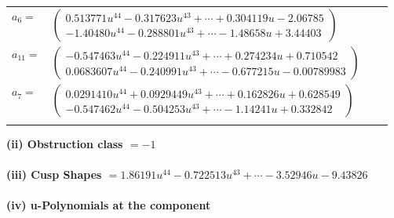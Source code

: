 \documentclass[1p]{elsarticle_modified}
\theoremstyle{definition}
\begin{document}
\begin{tabular}{m{7pt} m{180pt} m{7pt} m{180pt} }
\flushright $a_{6}=$&$\begin{pmatrix}0.513771 u^{44}-0.317623 u^{43}+\cdots+0.304119 u-2.06785\\-1.40480 u^{44}-0.288801 u^{43}+\cdots-1.48658 u+3.44403\end{pmatrix}$ \\
\flushright $a_{11}=$&$\begin{pmatrix}-0.547463 u^{44}-0.224911 u^{43}+\cdots+0.274234 u+0.710542\\0.0683607 u^{44}-0.240991 u^{43}+\cdots-0.677215 u-0.00789983\end{pmatrix}$ \\
\flushright $a_{7}=$&$\begin{pmatrix}0.0291410 u^{44}+0.0929449 u^{43}+\cdots+0.162826 u+0.628549\\-0.547462 u^{44}-0.504253 u^{43}+\cdots-1.14241 u+0.332842\end{pmatrix}$\\&\end{tabular}
\flushleft \textbf{(ii) Obstruction class $= -1$}\\~\\
\flushleft \textbf{(iii) Cusp Shapes $= 1.86191 u^{44}-0.722513 u^{43}+\cdots-3.52946 u-9.43826$}\\~\\
\newpage\renewcommand{\arraystretch}{1}
\flushleft \textbf{(iv) u-Polynomials at the component}\newline \\
\end{document}
